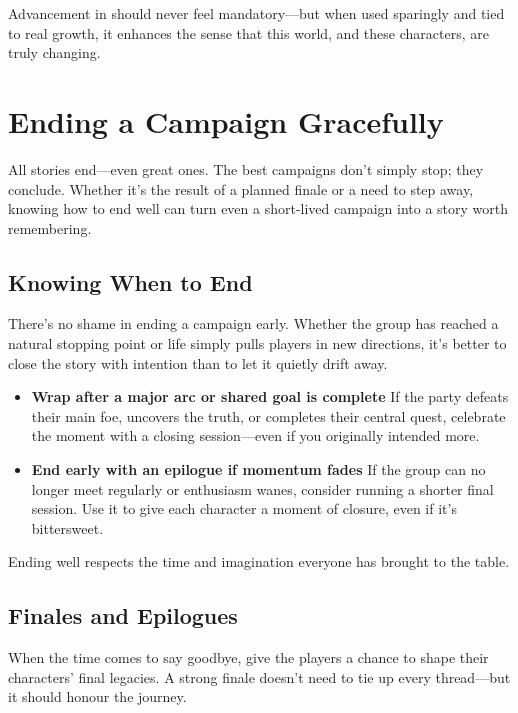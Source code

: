 Advancement in \wyrd should never feel mandatory—but when used sparingly and tied to real growth, it enhances the sense that this world, and these characters, are truly changing.

\section{Ending a Campaign Gracefully}

All stories end—even great ones. The best campaigns don’t simply stop; they conclude. Whether it’s the result of a planned finale or a need to step away, knowing how to end well can turn even a short-lived campaign into a story worth remembering.

\subsection*{Knowing When to End}

There’s no shame in ending a campaign early. Whether the group has reached a natural stopping point or life simply pulls players in new directions, it’s better to close the story with intention than to let it quietly drift away.

\begin{itemize}
    \item \textbf{Wrap after a major arc or shared goal is complete}  
    If the party defeats their main foe, uncovers the truth, or completes their central quest, celebrate the moment with a closing session—even if you originally intended more.

    \item \textbf{End early with an epilogue if momentum fades}  
    If the group can no longer meet regularly or enthusiasm wanes, consider running a shorter final session. Use it to give each character a moment of closure, even if it’s bittersweet.
\end{itemize}

Ending well respects the time and imagination everyone has brought to the table.

\subsection*{Finales and Epilogues}

When the time comes to say goodbye, give the players a chance to shape their characters’ final legacies. A strong finale doesn’t need to tie up every thread—but it should honour the journey.

